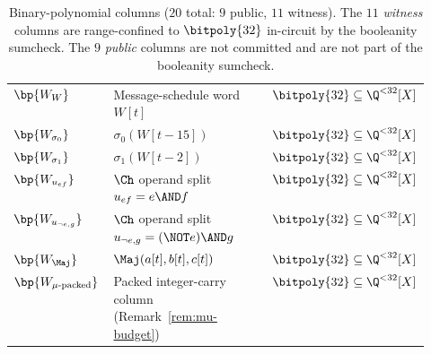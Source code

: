 \begin{table}[h]
\begin{tabularx}{\linewidth}{>{\raggedright\arraybackslash}p{0.24\linewidth} >{\raggedright\arraybackslash}X >{\raggedright\arraybackslash}p{0.30\linewidth}}
$\bp{W_W}$              & Message-schedule word $W[t]$ & $\bitpoly{32} \subseteq \Q^{<32}[X]$ \\
$\bp{W_{\sigma_0}}$     & $\sigma_0(W[t-15])$ & $\bitpoly{32} \subseteq \Q^{<32}[X]$ \\
$\bp{W_{\sigma_1}}$     & $\sigma_1(W[t-2])$ & $\bitpoly{32} \subseteq \Q^{<32}[X]$ \\
$\bp{W_{u_{ef}}}$       & $\Ch$ operand split $u_{ef} = e \AND f$ & $\bitpoly{32} \subseteq \Q^{<32}[X]$ \\
$\bp{W_{u_{\neg e,g}}}$ & $\Ch$ operand split $u_{\neg e,g} = (\NOT e) \AND g$ & $\bitpoly{32} \subseteq \Q^{<32}[X]$ \\
$\bp{W_{\Maj}}$         & $\Maj(a[t],b[t],c[t])$ & $\bitpoly{32} \subseteq \Q^{<32}[X]$ \\
$\bp{W_{\mu\text{-packed}}}$ & Packed integer-carry column (Remark~\ref{rem:mu-budget}) & $\bitpoly{32} \subseteq \Q^{<32}[X]$ \\
\bottomrule
\end{tabularx}
\caption{Binary-polynomial columns ($20$ total: $9$ public, $11$ witness). The $11$ \emph{witness} columns are range-confined to $\bitpoly{32}$ in-circuit by the booleanity sumcheck. The $9$ \emph{public} columns are not committed and are not part of the booleanity sumcheck.}
\label{tab:bin-cols}
\end{table}

